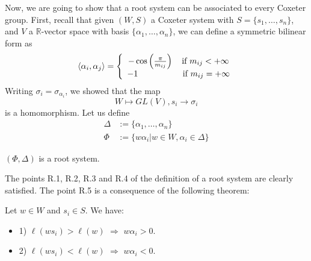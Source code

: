 \documentclass[envcountsame,envcountchap]{svmono}
\begin{document}
Now, we are going to show that a root system can be associated to every Coxeter group. First, recall that given $(W, S)$ a Coxeter system with $S = \{s_1, \ldots, s_n \}$, and $V$ a $\mathbb{R}$-vector space with basis $\{\alpha_1, \ldots, \alpha_n \}$, we can define a symmetric bilinear form as
\begin{equation}
\langle \alpha_i , \alpha_j \rangle = \left \{
\begin{array}{c @{} c}
    &- \cos \left(\frac{\pi}{m_{ij}} \right) \quad \text{if } m_{ij} < + \infty \\
    &-1 \quad ~~~~~~~~~~~~~\text{if } m_{ij} = + \infty \\
\end{array}
\right.
\end{equation} 	Writing $\sigma_i = \sigma_{\alpha_i}$, we showed that the map
\begin{equation}
W \mapsto GL(V), s_i \to \sigma_i
\label{correspondance}
\end{equation} is a homomorphism. Let us define
\begin{equation}
\begin{split}
\Delta &:= \{\alpha_1, \ldots, \alpha_n \} \\
\Phi &:= \{w \alpha_i | w \in W , \alpha_i \in \Delta \}
\end{split}
\end{equation}
	
\begin{theorem}
$(\Phi, \Delta)$ is a root system.
\end{theorem}	

The points R.1, R.2, R.3 and R.4 of the definition of a root system are clearly satisfied. The point R.5 is a consequence of the following theorem:

\begin{theorem}
Let $w \in W$ and $s_i \in S$. We have:
\begin{itemize}
\item 1) $\ell (w s_i) > \ell(w)$ $\Rightarrow$ $w \alpha_i > 0$. 
\item 2) $\ell (w s_i) < \ell (w)$ $\Rightarrow$ $w \alpha_i < 0$.
\end{itemize}
\label{theorem length}
\end{theorem}
	
\end{document}
